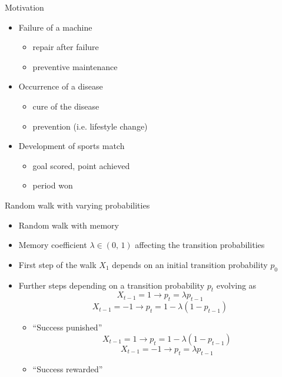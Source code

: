 \documentclass[american]{beamer}
\begin{document}
    \begin{frame}{Motivation}
        \begin{itemize}
            \item Failure of a machine
            \begin{itemize}
                \item repair after failure
                \item preventive maintenance
            \end{itemize}
            \item Occurrence of a disease
            \begin{itemize}
                \item cure of the disease
                \item prevention (i.e. lifestyle change)
            \end{itemize}
            \item Development of sports match
            \begin{itemize}
                \item goal scored, point achieved
                \item period won
            \end{itemize}
        \end{itemize}
    \end{frame}

    \begin{frame}{Random walk with varying probabilities}
        \begin{itemize}
            \item Random walk with memory
            \item Memory coefficient $\lambda\in(0,\,1)$ affecting the transition probabilities
            \item First step of the walk $X_{1}$ depends on an initial transition probability $p_{0}$
            \item Further steps depending on a transition probability $p_{t}$ evolving as
            \[
                X_{t-1}=1\rightarrow p_{t}=\lambda p_{t-1}
            \]
            \[
                X_{t-1}=-1\rightarrow p_{t}=1-\lambda(1-p_{t-1})
            \]

            \begin{itemize}
                \item<1-> ``Success punished''
                \[
                    X_{t-1}=1\rightarrow p_{t}=1-\lambda(1-p_{t-1})
                \]
                \[
                    X_{t-1}=-1\rightarrow p_{t}=\lambda p_{t-1}
                \]
                \item<1-> ``Success rewarded''
            \end{itemize}
        \end{itemize}
    \end{frame}
\end{document}
